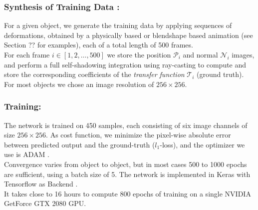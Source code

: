 \subsubsection*{Synthesis of Training Data :\\}
For a given object, we generate the training data by applying sequences of  deformations, obtained by a physically based or blendshape based animation (see Section ?? for examples), each of a total length of 500 frames. 
\\
For each frame $i \in [1,2,\dots,500]$ we store the position $\mathcal{P}_i$  and normal $\mathcal{N}_i$ images, and perform a full self-shadowing integration using ray-casting to compute and store the corresponding coefficients of the \textit{transfer function} $\mathcal{T}_i$ (ground truth).
\\
For most objects we chose an image resolution of $256 \times 256$. 

\subsubsection*{Training: \\} 
The network is trained on 450 samples, each consisting of six image channels of size $256 \times 256$. As cost function, we minimize the pixel-wise absolute error between predicted output and the ground-truth ($l_1$-loss), and the optimizer we use is ADAM \cite{ADAM}. 
\\
Convergence varies from object to object, but in most cases 500 to 1000 epochs are sufficient, using a batch size of 5. The network is implemented in Keras with Tensorflow as Backend \cite{Keras}. 
\\
It takes close to 16 hours to compute 800 epochs of training on a single NVIDIA GetForce GTX 2080 GPU.

